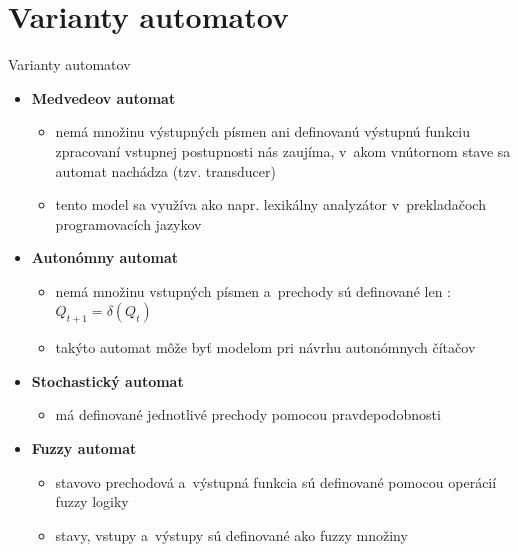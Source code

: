 \documentclass[hyperref={unicode}]{beamer}
\begin{document}
\section{Varianty automatov}
\begin{frame}{Varianty automatov}
\transwipe
\begin{itemize}
\pause
\item \textbf{Medvedeov automat}
\begin{itemize}
\pause
\item [\textendash] nemá množinu výstupných písmen ani definovanú výstupnú funkciu
zpracovaní vstupnej postupnosti nás zaujíma, v~akom vnútornom stave sa automat nachádza (tzv. transducer)
\item [\textendash] tento model sa využíva ako napr. lexikálny analyzátor v~prekladačoch programovacích jazykov
\end{itemize}
\pause
\item \textbf {Autonómny automat}
\begin{itemize}
\pause
\item [\textendash] nemá množinu vstupných písmen a~prechody sú definované len : $Q_{t+1}=\delta(Q_t)$
\item [\textendash] takýto automat môže byť modelom pri návrhu autonómnych čítačov
\end{itemize}
\end{itemize}
\end{frame}

\begin{frame}
\transwipe
\begin{itemize}
\item \textbf{Stochastický automat}
\begin{itemize}
\item [\textendash] má definované jednotlivé prechody pomocou pravdepodobnosti
\end{itemize}
\item \textbf{Fuzzy automat}
\begin{itemize}
\item [\textendash] stavovo prechodová a~výstupná funkcia sú definované pomocou operácií fuzzy logiky 
\item [\textendash] stavy, vstupy a~výstupy sú definované ako fuzzy množiny 
\end{itemize}
\end{itemize}
\end{frame}
\end{document}
